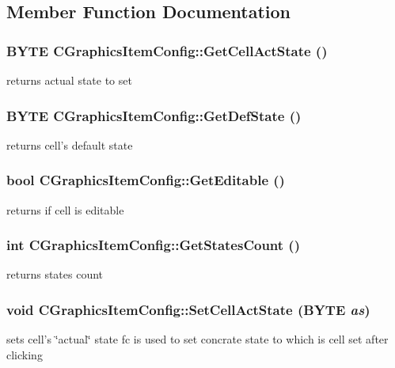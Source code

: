 \subsection{Member Function Documentation}
\hypertarget{classCGraphicsItemConfig_abca82eef98adf65fe2511c1ad75faecd}{
\subsubsection[{GetCellActState}]{\setlength{\rightskip}{0pt plus 5cm}BYTE CGraphicsItemConfig::GetCellActState ()}}
\label{classCGraphicsItemConfig_abca82eef98adf65fe2511c1ad75faecd}
returns actual state to set \hypertarget{classCGraphicsItemConfig_a3a7aac98e22bfdce17e0383a89913fbc}{
\subsubsection[{GetDefState}]{\setlength{\rightskip}{0pt plus 5cm}BYTE CGraphicsItemConfig::GetDefState ()}}
\label{classCGraphicsItemConfig_a3a7aac98e22bfdce17e0383a89913fbc}
returns cell's default state \hypertarget{classCGraphicsItemConfig_a4948f7749819061051b596111969839a}{
\subsubsection[{GetEditable}]{\setlength{\rightskip}{0pt plus 5cm}bool CGraphicsItemConfig::GetEditable ()}}
\label{classCGraphicsItemConfig_a4948f7749819061051b596111969839a}
returns if cell is editable \hypertarget{classCGraphicsItemConfig_a63cb5e11443735539db0efe93090a5a5}{
\subsubsection[{GetStatesCount}]{\setlength{\rightskip}{0pt plus 5cm}int CGraphicsItemConfig::GetStatesCount ()}}
\label{classCGraphicsItemConfig_a63cb5e11443735539db0efe93090a5a5}
returns states count \hypertarget{classCGraphicsItemConfig_aa6207ae65027a39d7f6efefa665d4a30}{
\subsubsection[{SetCellActState}]{\setlength{\rightskip}{0pt plus 5cm}void CGraphicsItemConfig::SetCellActState (BYTE {\em as})}}
\label{classCGraphicsItemConfig_aa6207ae65027a39d7f6efefa665d4a30}
sets cell's \char`\"{}actual\char`\"{} state fc is used to set concrate state to which is cell set after clicking


